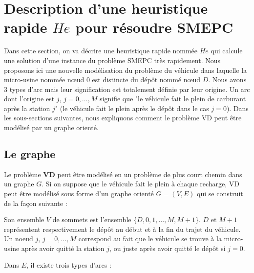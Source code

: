 \section{Description d'une heuristique rapide $He$ pour résoudre SMEPC}
\label{Heuristique_rapide}
Dans cette section, on va décrire une heuristique rapide nommée $He$ qui calcule une solution d'une instance du problème SMEPC très rapidement.
Nous proposons ici une nouvelle modélisation du problème du véhicule dans laquelle la micro-usine nommée nœud 0 est distincte du dépôt nommé nœud $D$. Nous avons 3 types d'arc mais leur signification est totalement définie par leur origine. Un arc dont l'origine est $j$, $j=0, \dots, M$ signifie que "le véhicule fait le plein de carburant après la station $j$" (le véhicule fait le plein après le dépôt dans le cas $j=0$).
Dans les sous-sections suivantes, nous expliquons comment le problème VD peut être modélisé par un graphe orienté.
\subsection{Le graphe}
Le problème \textbf{VD} peut être modélisé en un problème de plus court chemin dans un graphe $G$.
Si on suppose que le véhicule fait le plein à chaque recharge, VD peut être modélisé sous forme d'un graphe orienté $G = (V,E)$ qui se construit de la façon suivante :

Son ensemble $V$ de sommets est l'ensemble $\{D,0,1, \dots, M, M+1\}$. $D$ et $M+1$ représentent respectivement le dépôt au début et à la fin du trajet du véhicule. Un noeud $j$, $j=0, \dots, M$ correspond au fait que le véhicule se trouve à la micro-usine après avoir quitté la station $j$, ou juste après avoir quitté le dépôt si $j=0$.

Dans $E$, il existe trois types d'arcs :

